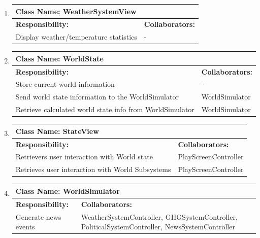 \documentclass[]{article}
\begin{document}
\begin{enumerate}[1.]
\begin{tabular}{|p{10cm}|p{4cm}|}
	    \hline
	  \end{tabular}

	\item
	\begin{tabular}{|p{10cm}|p{4cm}|}
	    \hline
	     \multicolumn{2}{|l|}{\textbf{Class Name:  WeatherSystemView}} \\
	    \hline
	    \textbf{Responsibility:} & \textbf{Collaborators:} \\
	    \hline
	    Display weather/temperature statistics & - \\

	    \hline
	  \end{tabular}

	\item
	\begin{tabular}{|p{10cm}|p{4cm}|}
	    \hline
	     \multicolumn{2}{|l|}{\textbf{Class Name:  WorldState}} \\
	    \hline
	    \textbf{Responsibility:} & \textbf{Collaborators:} \\
	    \hline
	    Store current world information & - \\
	Send world state information to the WorldSimulator & WorldSimulator \\
	Retrieve calculated world state info from WorldSimulator & WorldSimulator \\

	    \hline
	  \end{tabular}

	\item
	\begin{tabular}{|p{10cm}|p{4cm}|}
	    \hline
	     \multicolumn{2}{|l|}{\textbf{Class Name:  StateView}} \\
	    \hline
	    \textbf{Responsibility:} & \textbf{Collaborators:} \\
	    \hline
	    Retrievers user interaction with World state & PlayScreenController \\
	Retrieves user interaction with World Subsystems & PlayScreenController \\

	    \hline
	  \end{tabular}

	\item
	\begin{tabular}{|p{10cm}|p{4cm}|}
	    \hline
	     \multicolumn{2}{|l|}{\textbf{Class Name:  WorldSimulator}} \\
	    \hline
	    \textbf{Responsibility:} & \textbf{Collaborators:} \\
	    \hline
	    Generate news events & WeatherSystemController, GHGSystemController, PoliticalSystemController, NewsSystemController \\

	    \hline
	  \end{tabular}

	
\end{enumerate}
\end{document}
